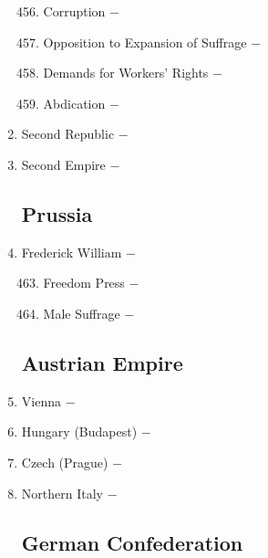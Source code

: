 \documentclass[12pt]{article}
\begin{document}
\begin{enumerate}
\begin{enumerate}[label=\arabic{*}.]
\setcounter{enumii}{455}

\item Corruption $-$ 

\item Opposition to Expansion of Suffrage $-$ 

\item Demands for Workers' Rights $-$ 

\item Abdication $-$

\end{enumerate}
\setcounter{enumi}{459}

\item Second Republic $-$ 

\item Second Empire $-$ 

\subsection{Prussia}

\item Frederick William $-$ 

\begin{enumerate}[label=\arabic{*}.]
\setcounter{enumii}{462}

\item Freedom Press $-$ 

\item Male Suffrage $-$ 

\end{enumerate}
\setcounter{enumi}{464}

\subsection{Austrian Empire}

\item Vienna $-$ 

\item Hungary (Budapest) $-$ 

\item Czech (Prague) $-$ 

\item Northern Italy $-$ 

\subsection{German Confederation}



\end{enumerate}
\end{document}
